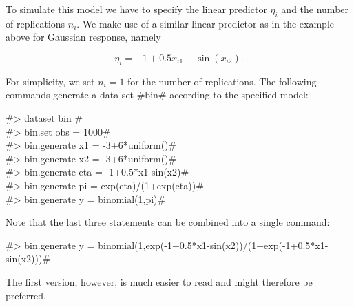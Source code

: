 To simulate this model we have to specify the linear predictor
$\eta_i$ and the number of replications $n_i$. We make use of a
similar linear predictor as in the example above for Gaussian
response, namely

$$
\eta_i = -1+0.5x_{i1}-\sin(x_{i2}).
$$

For simplicity, we set $n_i=1$ for the number of replications. The
following commands generate a data set #bin# according to the
specified model:


#> dataset bin #\\
#> bin.set obs = 1000# \\
#> bin.generate x1 = -3+6*uniform()# \\
#> bin.generate x2 = -3+6*uniform()# \\
#> bin.generate eta = -1+0.5*x1-sin(x2)# \\
#> bin.generate pi = exp(eta)/(1+exp(eta))# \\
#> bin.generate y = binomial(1,pi)#

Note that the last three statements can be combined into a single command:

#> bin.generate y = binomial(1,exp(-1+0.5*x1-sin(x2))/(1+exp(-1+0.5*x1-sin(x2)))#


The first version, however, is much easier to read and might
therefore be preferred.
